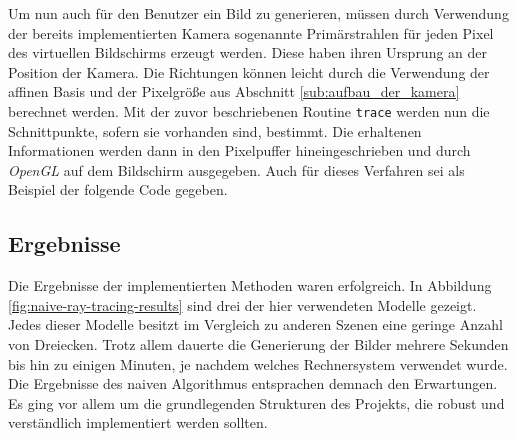 \documentclass[crop=false]{standalone}
\begin{document}
      Um nun auch für den Benutzer ein Bild zu generieren, müssen durch Verwendung der bereits implementierten Kamera sogenannte Primärstrahlen für jeden Pixel des virtuellen Bildschirms erzeugt werden.
      Diese haben ihren Ursprung an der Position der Kamera.
      Die Richtungen können leicht durch die Verwendung der affinen Basis und der Pixelgröße aus Abschnitt \ref{sub:aufbau_der_kamera} berechnet werden.
      Mit der zuvor beschriebenen Routine \texttt{trace} werden nun die Schnittpunkte, sofern sie vorhanden sind, bestimmt.
      Die erhaltenen Informationen werden dann in den Pixelpuffer hineingeschrieben und durch \textit{OpenGL} auf dem Bildschirm ausgegeben.
      Auch für dieses Verfahren sei als Beispiel der folgende Code gegeben.


    \subsection{Ergebnisse} %
    \label{sub:ergebnisse}
      Die Ergebnisse der implementierten Methoden waren erfolgreich.
      In Abbildung \ref{fig:naive-ray-tracing-results} sind drei der hier verwendeten Modelle gezeigt.
      Jedes dieser Modelle besitzt im Vergleich zu anderen Szenen eine geringe Anzahl von Dreiecken.
      Trotz allem dauerte die Generierung der Bilder mehrere Sekunden bis hin zu einigen Minuten, je nachdem welches Rechnersystem verwendet wurde.
      Die Ergebnisse des naiven Algorithmus entsprachen demnach den Erwartungen.
      Es ging vor allem um die grundlegenden Strukturen des Projekts, die robust und verständlich implementiert werden sollten.
\end{document}
